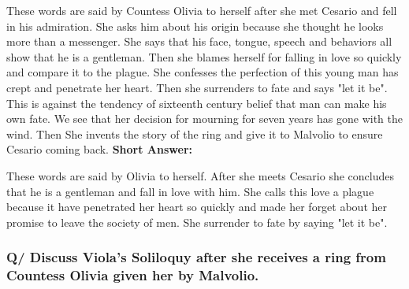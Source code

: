 \documentclass[12pt, a4paper]{article}
\begin{document}
These words are said by Countess Olivia to herself after she met Cesario
and fell in his admiration. She asks him about his origin because she
thought he looks more than a messenger. She says that his face, tongue, 
speech and behaviors all show that he is a gentleman. Then she blames
herself for falling in love so quickly and compare it to the plague. 
She confesses the perfection of this young man has crept and penetrate
her heart. Then she surrenders to fate and says "let it be". This is
against the tendency of sixteenth century belief that man can make his own
fate. We see that her decision for mourning for seven years has gone
with the wind. Then She invents the story of the ring and give it to 
Malvolio to ensure Cesario coming back.
\newpage
\textbf{Short Answer:}

These words are said by Olivia to herself. After she meets Cesario
she concludes that he is a gentleman and fall in love with him.
She calls this love a plague because it have penetrated her heart so quickly
and made her forget about her promise to leave the society of men. She 
surrender to fate by saying "let it be".



\subsubsection*{Q/ Discuss Viola's Soliloquy after she receives a ring
from Countess Olivia given her by Malvolio.}
\end{document}
